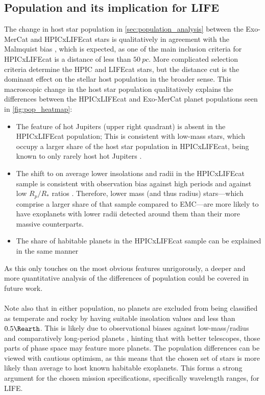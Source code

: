 \subsection{Population and its implication for LIFE}
The change in host star population in  \cref{sec:population_analysis} between the Exo-MerCat and HPICxLIFEcat stars is qualitatively in agreement with the Malmquist bias \cite{1922MeLuF.100....1M}, which is expected, as one of the main inclusion criteria for HPICxLIFEcat is a distance of less than $\qty{50}{pc}$. More complicated selection criteria determine the HPIC and LIFEcat stars, but the distance cut is the dominant effect on the stellar host population in the broader sense. This macroscopic change in the host star population qualitatively explains the differences between the HPICxLIFEcat and Exo-MerCat planet populations seen in \cref{fig:pop_heatmap}:  
\begin{itemize}
    \item The feature of hot Jupiters (upper right quadrant) is absent in the HPICxLIFEcat population; This is consistent with low-mass stars, which occupy a larger share of the host star  population in HPICxLIFEcat, being known to only rarely host hot Jupiters \cite{Ganetal2023}.
    \item The shift to on average lower insolations and radii in the HPICxLIFEcat sample is consistent with observation bias against high periods and against low $R_p/R_*$ ratios \cite{Guyon2017}. Therefore, lower mass (and thus radius) stars---which comprise a larger share of that sample compared to EMC---are more likely to have exoplanets with lower radii detected around them than their more massive counterparts.  
    \item The share of habitable planets in the HPICxLIFEcat sample can be explained in the same manner
\end{itemize}
As this only touches on the most obvious features unrigorously, a deeper and more quantitative analysis of the differences of population could be covered in future work. 
\\ \\
Note also that in either population, no  planets are excluded from being classified as temperate and rocky by having suitable insolation values and less than $0.5\Rearth$. This is likely due to observational biases against low-mass/radius and comparatively long-period planets \cite{Guyon2017}, hinting that with better telescopes, those parts of phase space may feature more planets.
The population differences can be viewed with cautious optimism, as this means that the chosen set of stars is more likely than average to host known habitable exoplanets. This forms a strong argument for the chosen mission specifications, specifically wavelength ranges, for LIFE.
